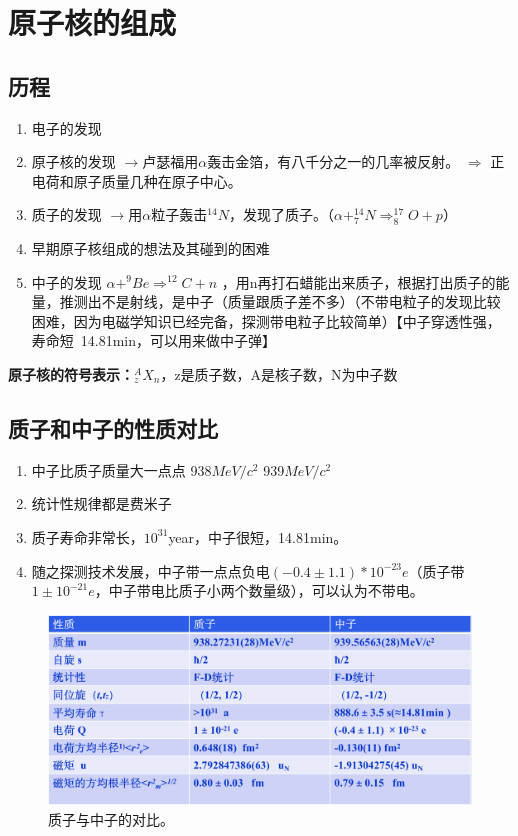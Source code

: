 \chapter{原子核的组成}

\section{历程} 

\begin{enumerate}
    \item 电子的发现 
    \item 原子核的发现 $\rightarrow$卢瑟福用$\alpha$轰击金箔，有八千分之一的几率被反射。 $\Rightarrow$ 正电荷和原子质量几种在原子中心。
    \item 质子的发现 $\rightarrow$用$\alpha$粒子轰击$^{14}N$，发现了质子。（$\alpha +  ^{14}_{7}N \Rightarrow  ^{17}_{8}O + p$）
    \item 早期原子核组成的想法及其碰到的困难
    \item 中子的发现 $\alpha + ^{9}Be \Rightarrow ^{12}C + n$  ，用n再打石蜡能出来质子，根据打出质子的能量，推测出不是射线，是中子（质量跟质子差不多）（不带电粒子的发现比较困难，因为电磁学知识已经完备，探测带电粒子比较简单）【中子穿透性强，寿命短~14.81min，可以用来做中子弹】
\end{enumerate}

\vspace{1.2em}

\textbf{原子核的符号表示：}$_{z}^{A}X_{n}$，z是质子数，A是核子数，N为中子数

\section{质子和中子的性质对比} 

\begin{enumerate}
    \item 中子比质子质量大一点点  938$MeV/c^2$  939$MeV/c^2$
    \item 统计性规律都是费米子
    \item 质子寿命非常长，$10^{31}$year，中子很短，14.81min。
    \item 随之探测技术发展，中子带一点点负电$(-0.4\pm 1.1)*10^{-23}e$（质子带$1\pm10^{-21}e$，中子带电比质子小两个数量级），可以认为不带电。
\end{enumerate}

\begin{figure}[htbp]
    \centering
    \includegraphics[width=14cm]{figure//fig001.png}
    \caption{\label{fig001}质子与中子的对比。}
\end{figure}

